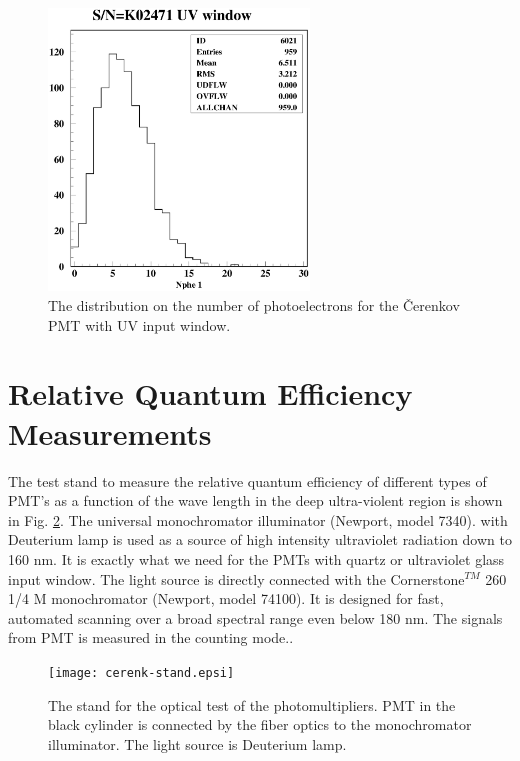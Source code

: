 \documentclass[11pt,titlepage]{article}
\begin{document}
 \begin{figure}
 \hspace{-0.5cm}
 \begin{centering}
  \includegraphics[height=7.5cm]{k02471_ph.eps}
 \vspace{-1cm}
 \caption{\label{stand_phe}
The distribution on the number of photoelectrons for the \v Cerenkov PMT with UV input window.}
\end{centering}
 \end{figure}

\section{Relative Quantum Efficiency Measurements}

The test stand to measure the relative quantum efficiency of different types of 
PMT's as a function of the wave length in the deep ultra-violent region is shown in 
Fig. \ref{clas12_optics}. 
The universal monochromator illuminator (Newport, model 7340).
with Deuterium lamp is used as a source of high intensity ultraviolet 
radiation down to 160 nm. It is exactly what we need for the PMTs with quartz or ultraviolet 
glass input window. The light source is directly connected with 
the Cornerstone$^{TM}$ 260 1/4 M monochromator (Newport, model 74100). It is designed
for fast, automated scanning over a broad spectral range even below 180 nm.
The signals from PMT is measured in the counting mode..


 \begin{figure}
 \hspace{0.5cm}
 \begin{centering}
  \texttt{[image: cerenk-stand.epsi]}
 \vspace{0.5cm}
 \caption{\label{clas12_optics}
The stand for the optical test of the photomultipliers. PMT in the black cylinder
is connected by the fiber optics to the monochromator illuminator. The light source is Deuterium lamp.}
 \end{centering}
 \end{figure}
\end{document}
